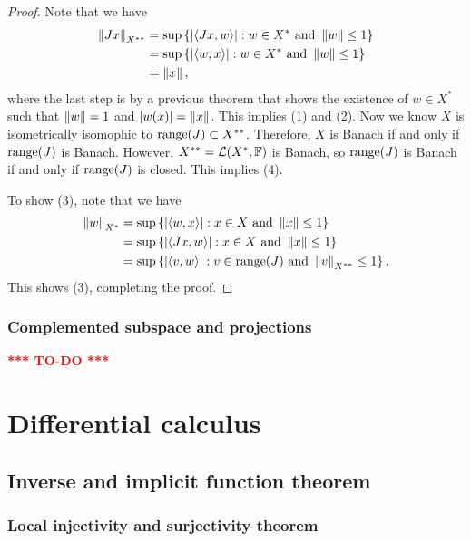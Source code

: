 \documentclass[a4paper]{article}
\newcommand{\TODO}{\textcolor{red}{\textbf{*** TO-DO ***}}}
\begin{document}
\begin{proof}
  Note that we have
  \[
    \begin{aligned}
      \left\lVert Jx\right\rVert_{X^{**}}
       & = \sup \left\{ \left\lvert \left\langle Jx, w \right\rangle\right\rvert: w \in X^* \text{ and } \left\lVert w\right\rVert \leq 1 \right\} \\
       & = \sup \left\{ \left\lvert \left\langle w, x \right\rangle\right\rvert: w \in X^* \text{ and } \left\lVert w\right\rVert \leq 1 \right\}  \\
       & = \left\lVert x\right\rVert,
    \end{aligned}
  \]
  where the last step is by a previous theorem that shows the existence of
  $w \in X^*$ such that $\left\lVert w\right\rVert = 1$ and $\left\lvert w(x)\right\rvert = \left\lVert x\right\rVert$. This
  implies (1) and (2). Now we know $X$ is isometrically isomophic to
  $\operatorname{range}(J) \subset X^{**}$. Therefore, $X$ is Banach if and only if
  $\operatorname{range}(J)$ is Banach. However, $X^{**} = \mathcal{L}(X^*, \mathbb{F})$ is Banach, so
  $\operatorname{range}(J)$ is Banach if and only if $\operatorname{range}(J)$ is closed. This implies
  (4).

  To show (3), note that we have
  \[
    \begin{aligned}
      \left\lVert w\right\rVert_{X^*}
       & = \sup \left\{ \left\lvert \left\langle w, x \right\rangle\right\rvert : x \in X \text{ and } \left\lVert x\right\rVert \leq 1 \right\}                 \\
       & = \sup \left\{ \left\lvert \left\langle Jx, w \right\rangle\right\rvert : x \in X \text{ and } \left\lVert x\right\rVert \leq 1 \right\}                \\
       & = \sup \left\{ \left\lvert \left\langle v, w \right\rangle\right\rvert : v \in \operatorname{range}(J) \text{ and } \left\lVert v\right\rVert_{X^{**}} \leq 1 \right\}.
    \end{aligned}
  \]
  This shows (3), completing the proof.
\end{proof}

\subsubsection{Complemented subspace and projections}

\TODO

\section{Differential calculus}

\subsection{Inverse and implicit function theorem}

\subsubsection{Local injectivity and surjectivity
  theorem}
\end{document}
